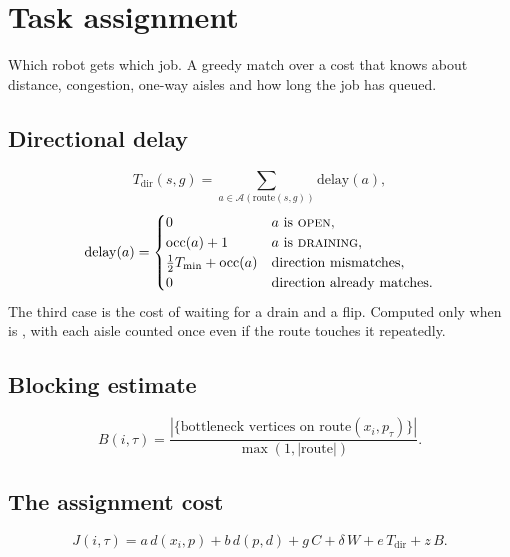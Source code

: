 \section{Task assignment}
\label{sec:assignment}

\begin{lede}
Which robot gets which job. A greedy match over a cost that knows about
distance, congestion, one-way aisles and how long the job has queued.
\end{lede}

\subsection{Directional delay}
\label{sec:assignment-delay}

\begin{equation}
  T_{\mathrm{dir}}(s, g) = \sum_{a \in \mathcal{A}(\mathrm{route}(s, g))} \mathrm{delay}(a),
\end{equation}
\begin{equation}
  \mathrm{delay}(a) =
  \begin{cases}
    0 & a \text{ is \textsc{open}},\\
    \mathrm{occ}(a) + 1 & a \text{ is \textsc{draining}},\\
    \tfrac{1}{2}T_{\min} + \mathrm{occ}(a) & \text{direction mismatches},\\
    0 & \text{direction already matches.}
  \end{cases}
\end{equation}
The third case is the cost of waiting for a drain and a flip. Computed only
when  is , with each aisle counted once
even if the route touches it repeatedly.

\subsection{Blocking estimate}

\begin{equation}
  B(i, \tau) = \frac{|\{\text{bottleneck vertices on } \mathrm{route}(x_i, p_\tau)\}|}
    {\max(1, |\mathrm{route}|)}.
\end{equation}

\subsection{The assignment cost}
\label{sec:assignment-cost}

\begin{equation}
  J(i, \tau) = a\, d(x_i, p) + b\, d(p, d) + g\, C + \delta\, W
    + e\, T_{\mathrm{dir}} + z\, B.
  \label{eq:assignment}
\end{equation}

